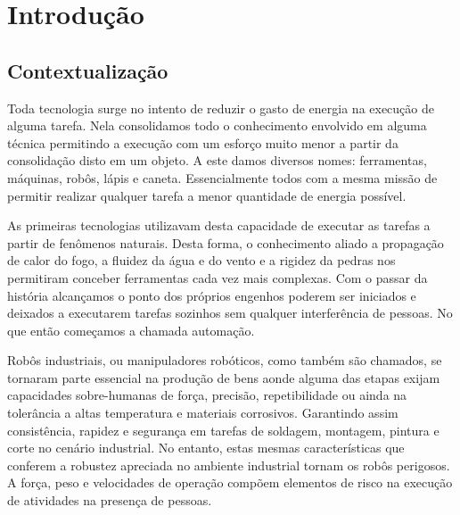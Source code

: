 \chapter{Introdução} \label{ch:intro}



\section{Contextualização}

Toda tecnologia surge no intento de reduzir o gasto de energia na execução de alguma tarefa. Nela consolidamos todo o conhecimento envolvido em alguma técnica permitindo a execução com um esforço muito menor a partir da consolidação disto em um objeto. A este damos diversos nomes: ferramentas, máquinas, robôs, lápis e caneta. Essencialmente todos com a mesma missão de permitir realizar qualquer tarefa a menor quantidade de energia possível.

As primeiras tecnologias utilizavam desta capacidade de executar as tarefas a partir de fenômenos naturais. Desta forma, o conhecimento aliado a propagação de calor do fogo, a fluidez da água e do vento e a rigidez da pedras nos permitiram conceber ferramentas cada vez mais complexas. Com o passar da história alcançamos o ponto dos próprios engenhos poderem ser iniciados e deixados a executarem tarefas sozinhos sem qualquer interferência de pessoas. No que então começamos a chamada automação.



Robôs industriais, ou manipuladores robóticos, como também são chamados, se tornaram parte essencial na produção de bens aonde alguma das etapas exijam capacidades sobre-humanas de força, precisão, repetibilidade ou ainda na tolerância a altas temperatura e materiais corrosivos. Garantindo assim consistência, rapidez e segurança em tarefas de soldagem, montagem, pintura e corte no cenário industrial. No entanto, estas mesmas características que conferem a robustez apreciada no ambiente industrial tornam os robôs perigosos. A força, peso e velocidades de operação compõem elementos de risco na execução de atividades na presença de pessoas.

